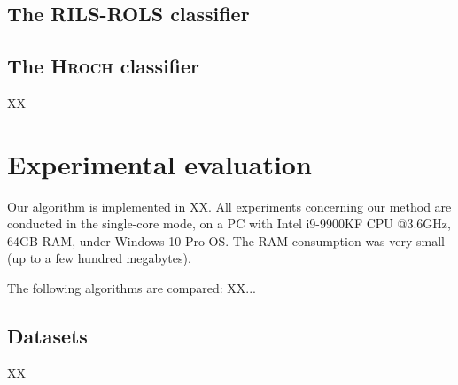 \documentclass{bmcart}
\begin{document}
\subsection{The \textsc{RILS}-\textsc{ROLS}  classifier}
 
 \subsection{The \textsc{Hroch}  classifier}
 XX
 
\section{Experimental evaluation}\label{sec:experiments}

Our  algorithm is implemented in XX. All experiments concerning our method are conducted in the single-core mode, on a PC with Intel i9-9900KF CPU @3.6GHz, 64GB RAM, under Windows 10 Pro OS. The RAM consumption was very small (up to a few hundred megabytes).   

The following algorithms  are compared: XX...


\subsection{Datasets}
 XX
 
\end{document}
